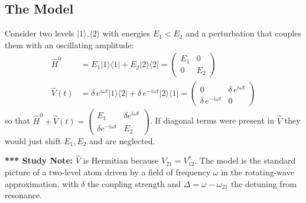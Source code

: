 \documentclass[11pt,a4paper]{article}
\begin{document}
\subsection{The Model}
Consider two levels $|1\rangle,|2\rangle$ with energies $E_1<E_2$ and a perturbation that couples them with an oscillating amplitude:
\begin{align*}
\hat H^0 &= E_1|1\rangle\langle1| + E_2|2\rangle\langle2| = \begin{pmatrix}E_1&0\\0&E_2\end{pmatrix}\\
\hat V(t) &= \delta\,e^{i\omega t}|1\rangle\langle2| + \delta\,e^{-i\omega t}|2\rangle\langle1| = \begin{pmatrix}0&\delta\,e^{i\omega t}\\ \delta\,e^{-i\omega t}&0\end{pmatrix}
\end{align*}
so that $\hat H^0+\hat V(t)=\begin{pmatrix}E_1&\delta e^{i\omega t}\\ \delta e^{-i\omega t}&E_2\end{pmatrix}$. If diagonal terms were present in $\hat V$ they would just shift $E_1,E_2$ and are neglected.

\begin{center}
\end{center}

\textbf{*** Study Note:} $\hat V$ is Hermitian because $V_{21}=V_{12}^*$. The model is the standard picture of a two-level atom driven by a field of frequency $\omega$ in the rotating-wave approximation, with $\delta$ the coupling strength and $\Delta=\omega-\omega_{21}$ the detuning from resonance.
\end{document}
